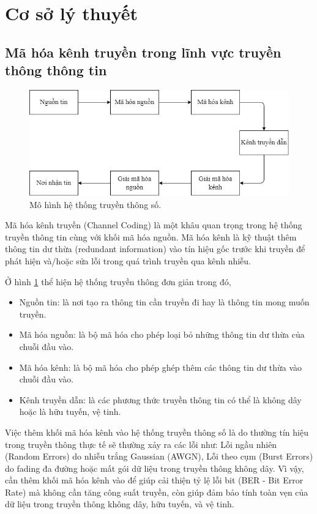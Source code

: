 \section{Cơ sở lý thuyết}

\subsection{Mã hóa kênh truyền trong lĩnh vực truyền thông thông tin}

\begin{figure}[H]
	\centering
	\includegraphics[width=0.6\linewidth]{sections/pic/cosolythuyet/ma-hoa-kenh.png}
	\caption{Mô hình hệ thống truyền thông số.}
	\label{f_mo-hinh-he-thong-truyen-thong-so}
\end{figure}

Mã hóa kênh truyền (Channel Coding) là một khâu quan trọng trong hệ thống truyền thông tin cùng với khối mã hóa nguồn. Mã hóa kênh là kỹ thuật thêm thông tin dư thừa (redundant information) vào tín hiệu gốc trước khi truyền để phát hiện và/hoặc sửa lỗi trong quá trình truyền qua kênh nhiễu.

Ở hình \ref{f_mo-hinh-he-thong-truyen-thong-so} thể hiện hệ thống truyền thông đơn giản trong đó,
\begin{itemize}[label=-]
	\item Nguồn tin: là nơi tạo ra thông tin cần truyền đi hay là thông tin mong muốn truyền.
	\item Mã hóa nguồn: là bộ mã hóa cho phép loại bỏ những thông tin dư thừa của chuỗi đầu vào.
	\item Mã hóa kênh: là bộ mã hóa cho phép ghép thêm các thông tin dư thừa vào chuỗi đầu vào.
	\item Kênh truyền dẫn: là các phương thức truyền thông tin có thể là không dây hoặc là hữu tuyến, vệ tinh.
\end{itemize}

Việc thêm khối mã hóa kênh vào hệ thống truyền thông số là do thường tín hiệu trong truyền thông thực tế sẽ thường xảy ra các lỗi như: Lỗi ngầu nhiên (Random Errors) do nhiễu trắng Gaussian (AWGN), Lỗi theo cụm (Burst Errors) do fading đa đường hoặc mất gói dữ liệu trong truyền thông không dây. Vì vậy, cần thêm khối mã hóa kênh vào để giúp cải thiện tỷ lệ lỗi bit (BER - Bit Error Rate) mà không cần tăng công suất truyền, còn giúp đảm bảo tính toàn vẹn của dữ liệu trong truyền thông không dây, hữu tuyến, và vệ tinh.

